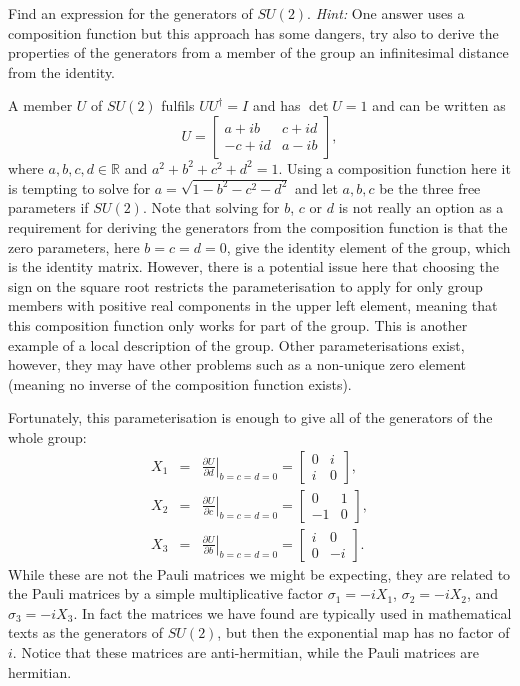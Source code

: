 \documentclass[notes.tex]{subfiles}
\begin{document}
\begin{Exercise}[difficulty={3},label=ex:SU2_generators]
Find an expression for the generators of $SU(2)$. {\it Hint:} One answer uses a composition function but this approach has some dangers, try also to derive the properties of the generators from a member of the group an infinitesimal distance from the identity.
\end{Exercise}
\begin{Answer}
A member $U$ of $SU(2)$ fulfils $UU^\dagger=I$ and has $\det U =1$ and can be written as 
\[U=\left[\begin{matrix} a+ib & c+id \\ -c+id &  a-ib \end{matrix}\right],\] 
where $a,b,c,d\in\mathbb R$ and $a^2+b^2+c^2+d^2=1$. Using a composition function here it is tempting to solve for $a=\sqrt{1-b^2-c^2-d^2}$ and let $a,b,c$ be the three free parameters if $SU(2)$. Note that solving for $b$, $c$ or $d$ is not really an option as a requirement for deriving the generators from the composition function is that the zero parameters, here $b=c=d=0$, give the identity element of the group, which is the identity matrix. However, there is a potential issue here that choosing the sign on the square root restricts the parameterisation to apply for only group members with positive real components in the upper left element, meaning that this composition function only works for part of the group. This is another example of a local description of the group.  Other parameterisations exist, however, they may have other problems such as a non-unique zero element (meaning no inverse of the composition function exists).

Fortunately, this parameterisation is enough to give all of the generators of the whole group:
\begin{eqnarray*} 
X_1&=&\left.\frac{\partial U}{\partial  d}\right|_{b=c=d=0}=\left[\begin{matrix} 0 & i \\ i & 0 \end{matrix}\right], \\
X_2&=&\left.\frac{\partial U}{\partial  c}\right|_{b=c=d=0}=\left[\begin{matrix} 0 & 1 \\ -1 & 0 \end{matrix}\right], \\
X_3&=&\left.\frac{\partial U}{\partial  b}\right|_{b=c=d=0}=\left[\begin{matrix} i & 0 \\ 0 & -i \end{matrix}\right].
\end{eqnarray*} 
While these are not the Pauli matrices we might be expecting, they are related to the Pauli matrices by a simple multiplicative factor $\sigma_1=-iX_1$,  $\sigma_2=-iX_2$,  and $\sigma_3=-iX_3$. In fact the matrices we have found are typically used in mathematical texts as the generators of $SU(2)$, but then the exponential map has no factor of $i$. Notice that these matrices are anti-hermitian, while the Pauli matrices are hermitian.


\end{Answer}
\end{document}
